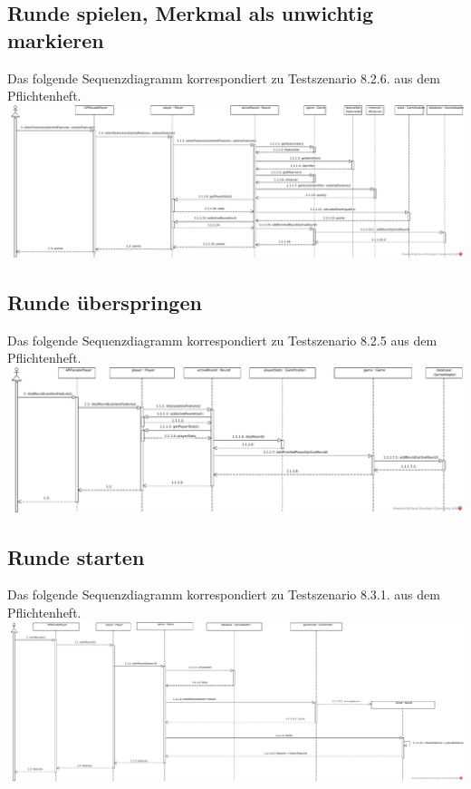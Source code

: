 \documentclass[a4paper]{scrreprt}
\begin{document}
    \subsection{Runde spielen, Merkmal als unwichtig markieren}
    Das folgende Sequenzdiagramm korrespondiert zu Testszenario 8.2.6. aus dem Pflichtenheft. \\
    \includegraphics[width=\textwidth]{img/RundeSpielen.pdf}

    \subsection{Runde überspringen}
    Das folgende Sequenzdiagramm korrespondiert zu Testszenario 8.2.5 aus dem Pflichtenheft. \\
    \includegraphics[width=\textwidth]{img/RundeUeberspringen.pdf}

    \subsection{Runde starten}
    Das folgende Sequenzdiagramm korrespondiert zu Testszenario 8.3.1. aus dem Pflichtenheft. \\
    \includegraphics[width=\textwidth]{img/RundeStarten.pdf}
\end{document}
